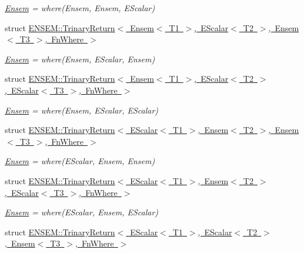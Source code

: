 \begin{DoxyCompactItemize}
\begin{DoxyCompactList}\small\item\em \mbox{\hyperlink{classENSEM_1_1Ensem}{Ensem}} = where(\+Ensem, Ensem, E\+Scalar) \end{DoxyCompactList}\item 
struct \mbox{\hyperlink{structENSEM_1_1TrinaryReturn_3_01Ensem_3_01T1_01_4_00_01EScalar_3_01T2_01_4_00_01Ensem_3_01T3_01_4_00_01FnWhere_01_4}{E\+N\+S\+E\+M\+::\+Trinary\+Return$<$ Ensem$<$ T1 $>$, E\+Scalar$<$ T2 $>$, Ensem$<$ T3 $>$, Fn\+Where $>$}}
\begin{DoxyCompactList}\small\item\em \mbox{\hyperlink{classENSEM_1_1Ensem}{Ensem}} = where(\+Ensem, E\+Scalar, Ensem) \end{DoxyCompactList}\item 
struct \mbox{\hyperlink{structENSEM_1_1TrinaryReturn_3_01Ensem_3_01T1_01_4_00_01EScalar_3_01T2_01_4_00_01EScalar_3_01T3_01_4_00_01FnWhere_01_4}{E\+N\+S\+E\+M\+::\+Trinary\+Return$<$ Ensem$<$ T1 $>$, E\+Scalar$<$ T2 $>$, E\+Scalar$<$ T3 $>$, Fn\+Where $>$}}
\begin{DoxyCompactList}\small\item\em \mbox{\hyperlink{classENSEM_1_1Ensem}{Ensem}} = where(\+Ensem, E\+Scalar, E\+Scalar) \end{DoxyCompactList}\item 
struct \mbox{\hyperlink{structENSEM_1_1TrinaryReturn_3_01EScalar_3_01T1_01_4_00_01Ensem_3_01T2_01_4_00_01Ensem_3_01T3_01_4_00_01FnWhere_01_4}{E\+N\+S\+E\+M\+::\+Trinary\+Return$<$ E\+Scalar$<$ T1 $>$, Ensem$<$ T2 $>$, Ensem$<$ T3 $>$, Fn\+Where $>$}}
\begin{DoxyCompactList}\small\item\em \mbox{\hyperlink{classENSEM_1_1Ensem}{Ensem}} = where(\+E\+Scalar, Ensem, Ensem) \end{DoxyCompactList}\item 
struct \mbox{\hyperlink{structENSEM_1_1TrinaryReturn_3_01EScalar_3_01T1_01_4_00_01Ensem_3_01T2_01_4_00_01EScalar_3_01T3_01_4_00_01FnWhere_01_4}{E\+N\+S\+E\+M\+::\+Trinary\+Return$<$ E\+Scalar$<$ T1 $>$, Ensem$<$ T2 $>$, E\+Scalar$<$ T3 $>$, Fn\+Where $>$}}
\begin{DoxyCompactList}\small\item\em \mbox{\hyperlink{classENSEM_1_1Ensem}{Ensem}} = where(\+E\+Scalar, Ensem, E\+Scalar) \end{DoxyCompactList}\item 
struct \mbox{\hyperlink{structENSEM_1_1TrinaryReturn_3_01EScalar_3_01T1_01_4_00_01EScalar_3_01T2_01_4_00_01Ensem_3_01T3_01_4_00_01FnWhere_01_4}{E\+N\+S\+E\+M\+::\+Trinary\+Return$<$ E\+Scalar$<$ T1 $>$, E\+Scalar$<$ T2 $>$, Ensem$<$ T3 $>$, Fn\+Where $>$}}

\end{DoxyCompactItemize}
